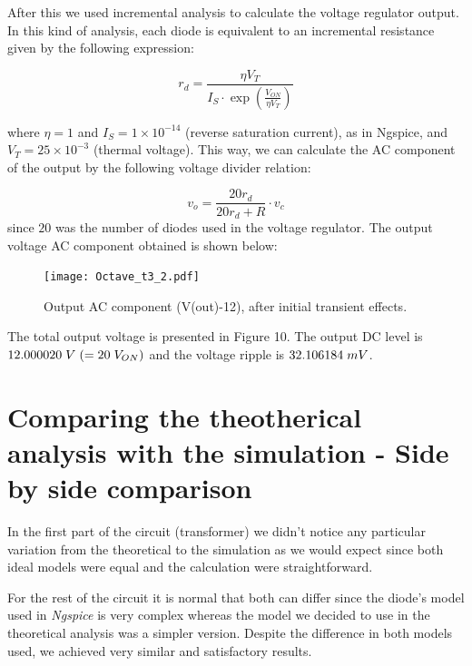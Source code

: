  
 After this we used incremental analysis to calculate the voltage regulator output.
  In this kind of analysis, each diode is equivalent to an incremental resistance given by the following expression:  
 
\begin{equation}
  r_{d} = \frac{\eta V_{T}}{I_{S}\cdot\exp{\left(\frac{V_{ON}}{\eta V_{T}}\right)}}
\end{equation}
  
 where $\eta=1$ and $I_{S}=1 \times 10^{-14}$ (reverse saturation current), as in Ngspice, and $V_{T}= 25 \times 10^{-3}$ 
 (thermal voltage). This way, we can calculate the AC component of the output by the following voltage divider relation:
 
 \begin{equation}
  v_{o}=\frac{20r_{d}}{20r_{d}+R}\cdot v_{c}
\end{equation}
 since $20$ was the number of diodes used in the voltage regulator.
 The output voltage AC component obtained is shown below:
 

  \begin{figure}[h] \centering
    \texttt{[image: Octave\_t3\_2.pdf]}
    \caption{Output AC component (V(out)-12), after initial transient effects.}
    \label{fig:1234}
  \end{figure} 
 
The total output voltage is presented in Figure 10.
The output DC level is $12.000020 \hspace{1mm}V\hspace{1mm} (= 20\hspace{1mm}V_{ON})$ and the voltage ripple is $32.106184\hspace{1mm}mV$.
 
 


\section{Comparing the theotherical analysis with the simulation - Side by side comparison}\label{sec:Comparison}
In the first part of the circuit (transformer) we didn't notice any particular variation from the theoretical to the simulation
as we would expect since both ideal models were equal and the calculation were straightforward.

For the rest of the circuit it is normal that both can differ since the diode's model used in \emph{Ngspice}
is very complex whereas the model we decided to use in the theoretical analysis was
a simpler version.
Despite the difference in both models used, we achieved very similar and satisfactory results.

